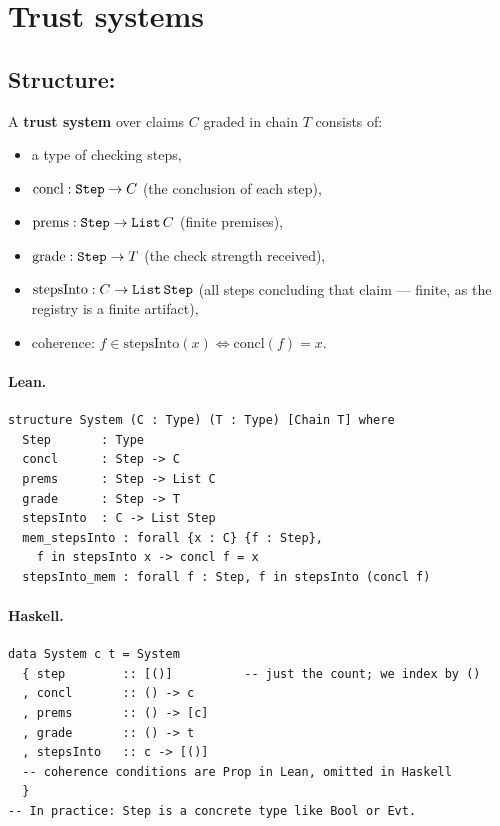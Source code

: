 \documentclass[11pt,a4paper]{article}
\begin{document}
\section{Trust systems}

\subsection{Structure: }

\begin{defn}
A \textbf{trust system} over claims $C$ graded in chain $T$ consists of:
\begin{itemize}
  \item a type  of checking steps,
  \item $\mathrm{concl} : \texttt{Step} \to C$ (the conclusion of each step),
  \item $\mathrm{prems} : \texttt{Step} \to \texttt{List}\,C$ (finite premises),
  \item $\mathrm{grade} : \texttt{Step} \to T$ (the check strength received),
  \item $\mathrm{stepsInto} : C \to \texttt{List}\,\texttt{Step}$ (all steps
    concluding that claim --- finite, as the registry is a finite artifact),
  \item coherence: $f \in \mathrm{stepsInto}(x) \iff \mathrm{concl}(f) = x$.
\end{itemize}
\end{defn}

\paragraph{Lean.}
\begin{lstlisting}[style=lean]
structure System (C : Type) (T : Type) [Chain T] where
  Step       : Type
  concl      : Step -> C
  prems      : Step -> List C
  grade      : Step -> T
  stepsInto  : C -> List Step
  mem_stepsInto : forall {x : C} {f : Step},
    f in stepsInto x -> concl f = x
  stepsInto_mem : forall f : Step, f in stepsInto (concl f)
\end{lstlisting}

\paragraph{Haskell.}
\begin{lstlisting}[style=haskell]
data System c t = System
  { step        :: [()]          -- just the count; we index by ()
  , concl       :: () -> c
  , prems       :: () -> [c]
  , grade       :: () -> t
  , stepsInto   :: c -> [()]
  -- coherence conditions are Prop in Lean, omitted in Haskell
  }
-- In practice: Step is a concrete type like Bool or Evt.
\end{lstlisting}
\end{document}

